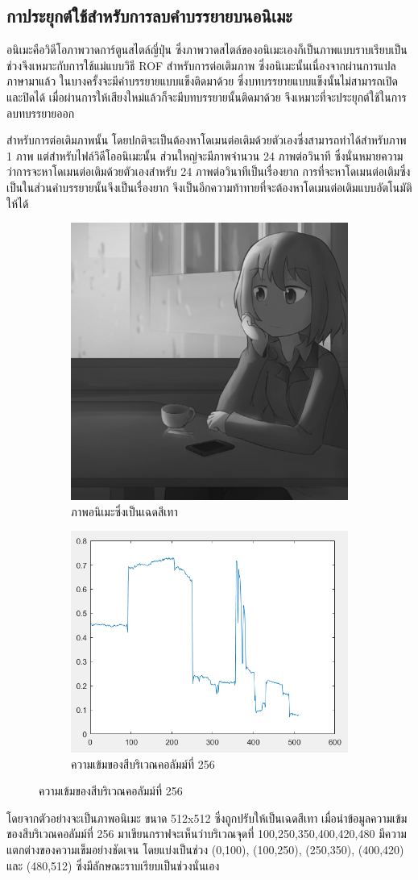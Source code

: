 \documentclass[hidelinks,a4paper,14pt]{article}
\numberwithin{equation}{section}							%
\begin{document}
{			
			\subsection{กาประยุกต์ใช้สำหรับการลบคำบรรยายบนอนิเมะ}
			\hspace{0.85cm}อนิเมะคือวิดีโอภาพวาดการ์ตูนสไตล์ญี่ปุ่น ซึ่งภาพวาดสไตล์ของอนิเมะเองก็เป็นภาพแบบราบเรียบเป็นช่วงจึงเหมาะกับการใช้แม่แบบวิธี ROF สำหรับการต่อเติมภาพ	ซึ่งอนิเมะนั้นเนื่องจากผ่านการแปลภาษามาแล้ว ในบางครั้งจะมีคำบรรยายแบบแข็งติดมาด้วย ซึ่งบทบรรยายแบบแข็งนั้นไม่สามารถเปิดและปิดได้ เมื่อผ่านการให้เสียงใหม่แล้วก็จะมีบทบรรยายนั้นติดมาด้วย จึงเหมาะที่จะประยุกต์ใช้ในการลบทบรรยายออก

			สำหรับการต่อเติมภาพนั้น โดยปกติจะเป็นต้องหาโดเมนต่อเติมด้วยตัวเองซึ่งสามารถทำได้สำหรับภาพ  1 ภาพ แต่สำหรับไฟล์วิดีโออนิเมะนั้น ส่วนใหญ่จะมีภาพจำนวน 24 ภาพต่อวินาที ซึ่งนั่นหมายความว่าการจะหาโดเมนต่อเติมด้วยตัวเองสำหรับ 24 ภาพต่อวินาทีเป็นเรื่องยาก การที่จะหาโดเมนต่อเติมซึ่งเป็นในส่วนคำบรรยายนั้นจึงเป็นเรื่องยาก จึงเป็นอีกความท้าทายที่จะต้องหาโดเมนต่อเติมแบบอัตโนมัติให้ได้
			
			\begin{figure}[H]
				\centering
				\begin{subfigure}{0.4\linewidth}
					\centering
					\includegraphics[width=0.4\linewidth]{images/show_peicewise/anime_gray.png}
					\caption{ภาพอนิเมะซึ่งเป็นเฉดสีเทา}
				\end{subfigure}
				\begin{subfigure}{0.4\linewidth}
					\centering
					\includegraphics[width=0.4\linewidth]{images/show_peicewise/anime_is_piecewise.png}
					\caption{ความเข้มของสีบริเวณคอลัมม์ที่ 256}
				\end{subfigure}				
			\end{figure}
			โดยจากตัวอย่างจะเป็นภาพอนิเมะ ขนาด 512x512 ซึ่งถูกปรับให้เป็นเฉดสีเทา เมื่อนำข้อมูลความเข้มของสีบริเวณคอลัมม์ที่ 256 มาเขียนกราฟจะเห็นว่าบริเวณจุดที่ 100,250,350,400,420,480 มีความแตกต่างของความเข็มอย่างชัดเจน โดยแบ่งเป็นช่วง (0,100), (100,250), (250,350), (400,420)  และ (480,512) ซึ่งมีลักษณะราบเรียบเป็นช่วงนั่นเอง
		
}
\end{document}

